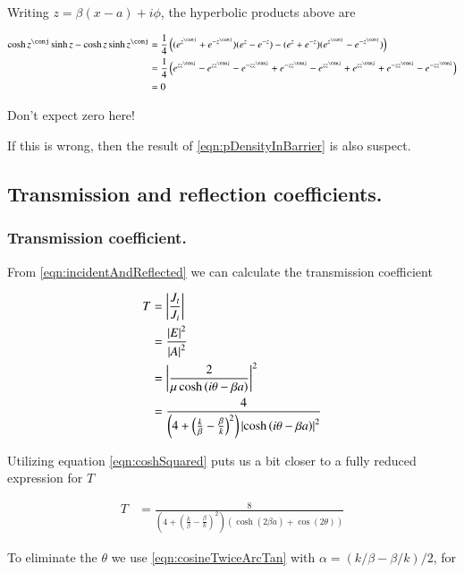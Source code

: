 \documentclass{article}
\begin{document}
Writing $z = \beta(x-a) + i\phi$, the hyperbolic products above are

\begin{align*}
\cosh z^\conj \sinh z - \cosh z \sinh z^\conj
&=
\inv{4} \left(
( e^{z^\conj} + e^{-z^\conj}) ( e^{z} - e^{-z}) 
- ( e^{z} + e^{-z}) ( e^{z^\conj} - e^{-z^\conj}) 
\right)
\\
&=
\inv{4} \left(
e^{z z^\conj} 
-e^{z z^\conj} 
-e^{-z z^\conj} 
+e^{-z z^\conj} 
- e^{z z^\conj}
+ e^{z z^\conj}
+ e^{-z z^\conj}
- e^{-z z^\conj} 
\right)
\\
&= 0
\end{align*}

Don't expect zero here!

If this is wrong, then the result of \ref{eqn:pDensityInBarrier} is also suspect.

\subsection{ Transmission and reflection coefficients. }

\subsubsection{ Transmission coefficient. }

From \ref{eqn:incidentAndReflected} we can calculate the transmission
coefficient

\begin{align*}
T 
&= \left\lvert{\frac{J_t}{J_i}}\right\rvert \\
&= \frac{\left\lvert{E}\right\rvert^2}{\left\lvert{A}\right\rvert^2} \\
&= \left\lvert{\frac{2  } { \mu \cosh\left( i\theta -\beta a \right) }}\right\rvert^2 \\
&= \frac{4} { 
\left(4 + \left( \frac{k}{\beta} -\frac{\beta}{k} \right)^2 \right)
\left\lvert{\cosh\left( i\theta -\beta a \right)}\right\rvert^2 }
\end{align*}

Utilizing equation \ref{eqn:coshSquared}
puts us a bit closer to a fully reduced expression for $T$

\begin{align*}
T 
&= \frac{8} { 
\left(4 + \left( \frac{k}{\beta} -\frac{\beta}{k} \right)^2 \right)
\left( \cosh(2\beta a) + \cos(2\theta) \right)
}
\end{align*}

To eliminate the $\theta$ we use \ref{eqn:cosineTwiceArcTan}
with $\alpha = ({k}/{\beta} - {\beta}/{k} )/2$, for
\end{document}
